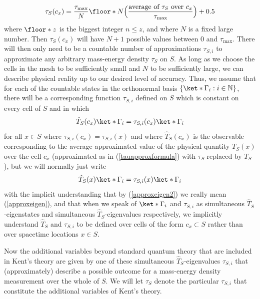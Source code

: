 \documentclass[12pt]{report}
\begin{document}
    \begin{equation}\label{tauapproxformula}
    \tau_S(c_x)=\frac{\tau_{\text{max}}}{N}\floor*{N\Big(\frac{\text{average of }\tau_S\text{ over }c_x}{\tau_{\text{max}}}\Big)+0.5}
    \end{equation}
    where $\floor*{z}$ is the biggest integer $n\leq z$, and where $N$ is a fixed large number. Then $\tau_S(c_x)$ will have $N+1$ possible values between $0$ and $\tau_{\text{max}}$.  There will then only need to be a countable number of approximations $\tau_{S,i}$ to approximate any arbitrary mass-energy density $\tau_S$ on $S$.  As long as we choose the cells in the mesh to be sufficiently small and $N$ to be sufficiently large, we can describe physical reality up to our desired level of accuracy. Thus, we assume that for each of the countable states in the orthonormal basis $\{\ket*{\Gamma_{i}}:i\in\mathbb{N}\}$, there will be a corresponding function $\tau_{S,i}$ defined on $S$ which is constant on every cell of $S$ and in which 
\begin{equation}\label{approxeigen}
\hat{T}_S(c_x)\ket*{\Gamma_{i}}= \tau_{S,i}(c_x)\ket*{\Gamma_{i}}
\end{equation} 
for all $x\in S$ where $ \tau_{S,i}(c_x)= \tau_{S,i}(x)$ and where $\hat{T}_S(c_x)$ is the observable corresponding to the average approximated value of the physical quantity $T_S(x)$ over the cell $c_x$ (approximated as in (\ref{tauapproxformula}) with $\tau_S$ replaced by $T_S$), but we will normally just write
\begin{equation}\label{approxeigen2}
  \hat{T}_S(x)\ket*{\Gamma_{i}}= \tau_{S,i}(x)\ket*{\Gamma_{i}}
  \end{equation}
with the implicit understanding that by (\ref{approxeigen2}) we really mean (\ref{approxeigen}), and that when we speak of $\ket*{\Gamma_{i}}$ and $\tau_{S,i}$ as simultaneous $\hat{T}_S$-eigenstates and simultaneous $\hat{T}_S$-eigenvalues respectively, we implicitly understand $\hat{T}_S$ and $\tau_{S,i}$ to be defined over cells of the form $c_x\subset S$ rather than over spacetime locations $x\in S$.

Now the additional variables beyond standard quantum theory that are included in Kent's theory are given by one of these simultaneous $\hat{T}_S$-eigenvalues $\tau_{S,i}$ that (approximately) describe a possible outcome for a mass-energy density measurement over the whole of $S$. We will let $\tau_S$ denote the particular  $\tau_{S,i}$ that constitute the additional variables of Kent's theory. 
\end{document}
